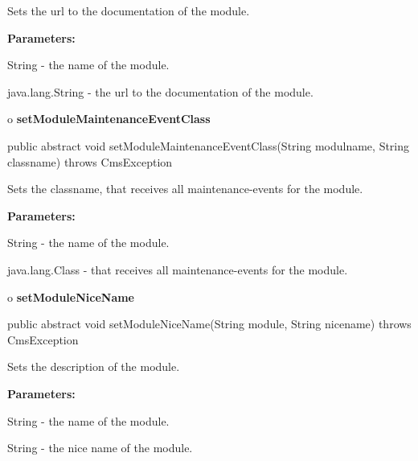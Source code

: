 \begin{description}
\htmlDD Sets the url to the documentation of the module. 

\begin{description}
\item {\bf Parameters:}  

String - the name of the module.  

java.lang.String - the url to the documentation of the module.  
\end{description}

\end{description}

o {\bf setModuleMaintenanceEventClass} 

\begin{PRE}
 public abstract void setModuleMaintenanceEventClass(String modulname,
                                                     String classname) throws CmsException
\end{PRE}

\begin{description}
\htmlDD Sets the classname, that receives all maintenance-events for the
module. 

\begin{description}
\item {\bf Parameters:}  

String - the name of the module.  

java.lang.Class - that receives all maintenance-events for the module.  
\end{description}

\end{description}

o {\bf setModuleNiceName} 

\begin{PRE}
 public abstract void setModuleNiceName(String module,
                                        String nicename) throws CmsException
\end{PRE}

\begin{description}
\htmlDD Sets the description of the module. 

\begin{description}
\item {\bf Parameters:}  

String - the name of the module.  

String - the nice name of the module.  
\end{description}

\end{description}


